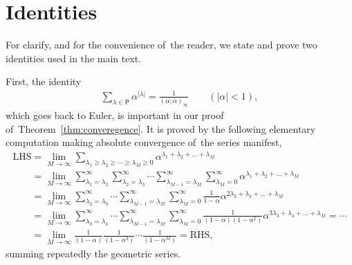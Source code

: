 \section{Identities}\label{app:Id}
For clarify, and for the convenience of~the reader, we state and prove two identities used in the main text.

First, the identity
\begin{gather}\label{Euler}
\sum_{\lambda\in\mathsf{P}}\alpha^{|\lambda|} = \frac1{(\alpha;\alpha)_\infty} \qquad (|\alpha|<1),
\end{gather}
which goes back to Euler, is important in our proof of~Theorem~\ref{thm:converegence}. It is proved by the following elementary computation making absolute convergence of~the series manifest,
\begin{gather}
\text{LHS} = \lim_{M\to\infty} \sum_{\lambda_1\geq \lambda_2\geq \cdots\geq \lambda_M\geq 0} \alpha^{\lambda_1+\lambda_2+\dots+\lambda_M}\nonumber
\\ \phantom{\text{LHS}}
{}= \lim_{M\to\infty} \sum_{\lambda_1=\lambda_2}^\infty \sum_{\lambda_2=\lambda_3}^\infty \cdots \sum_{\lambda_{M-1}=\lambda_M}^\infty \sum_{\lambda_M=0}^\infty \alpha^{\lambda_1+\lambda_2+\dots+\lambda_M}\nonumber
\\ \phantom{\text{LHS}}
{}= \lim_{M\to\infty} \sum_{\lambda_2=\lambda_3}^\infty \cdots \sum_{\lambda_{M-1}=\lambda_M}^\infty \sum_{\lambda_M=0}^\infty \frac{1}{1-\alpha}
\alpha^{2\lambda_2+\lambda_3 +\dots+\lambda_M}\nonumber
\\ \phantom{\text{LHS}}
{}= \lim_{M\to\infty} \sum_{\lambda_3=\lambda_4}^\infty \cdots \sum_{\lambda_{M-1}=\lambda_M}^\infty \sum_{\lambda_M=0}^\infty \frac{1}{(1-\alpha)(1-\alpha^2)}
\alpha^{3\lambda_3+\lambda_4 +\dots+\lambda_M} = \cdots \nonumber
\\ \phantom{\text{LHS}}
{}= \lim_{M\to\infty} \frac1{(1-\alpha)} \frac1{(1-\alpha^2)}\cdots \frac1{(1-\alpha^M)} = \text{RHS},
\label{Euler1}
\end{gather}
summing repeatedly the geometric series.
